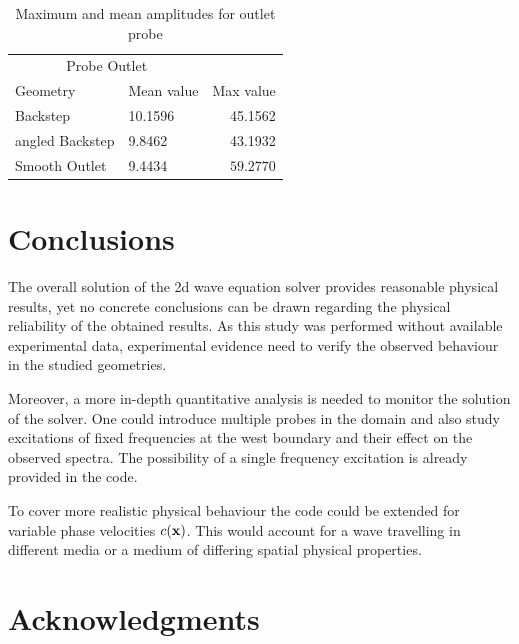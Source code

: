 \documentclass[fleqn,12pt]{NTFD} %
\begin{document}
\begin{table}[ht!]
\caption{Maximum and mean amplitudes for outlet probe}
\centering
\begin{tabular}{llr}
\toprule
\multicolumn{2}{c}{Probe Outlet} \\
\cmidrule(r){1-2}
Geometry & Mean value & Max value \\
\midrule

Backstep & 10.1596 & 45.1562 \\
angled Backstep & 9.8462 & 43.1932 \\
Smooth Outlet  & 9.4434 & $59.2770$ \\
\bottomrule
\end{tabular}
\label{tab:meanvalues outlet}
\end{table}



\section{Conclusions} %
The overall solution of the 2d wave equation solver provides reasonable physical results, yet no concrete conclusions can be drawn regarding the physical reliability of the obtained results. As this study was performed without available experimental data, experimental evidence need to verify the observed behaviour in the studied geometries.

 Moreover, a more in-depth quantitative analysis is needed to monitor the solution of the solver. One could introduce multiple probes in the domain and also study excitations of fixed frequencies at the west boundary and their effect on the observed spectra. The possibility of a single frequency excitation is already provided in the code.  
 
 To cover more realistic physical behaviour the code could be extended for variable phase velocities $c(\vb{x})$. This would account for a wave travelling in different media or a medium of differing spatial physical properties. 



\section*{Acknowledgments} %
\end{document}

